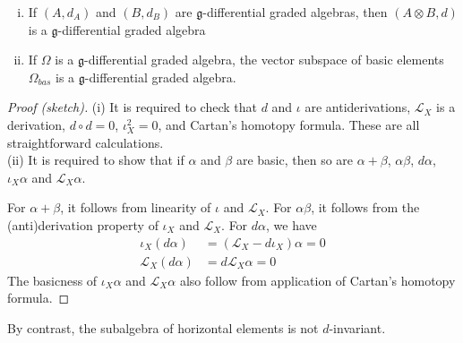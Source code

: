 \begin{prop}  \label{prop:dga_operations}
	\phantom{}	%
	\begin{enumerate}[(i), leftmargin=\parindent]
	    \item 
			If $(A,d_A)$ and  $(B,d_B)$ are $\mathfrak{g}$-differential graded 
			algebras, then $(A\otimes B,d)$ is a $\mathfrak{g}$-differential graded 
			algebra
		\item 
	If $\Omega$ is a  $\mathfrak{g}$-differential graded algebra, the vector
	subspace of basic elements $\Omega_{bas}$ is a $\mathfrak{g}$-differential
	graded algebra.
	\end{enumerate}
\end{prop}
\begin{proof}[Proof (sketch)]
	(i) It is required to check that $d$ and $\iota$ are antiderivations,
	$\mathcal{L}_X$ is a derivation, $d\circ d = 0$,  $\iota_X^2=0$, and
	Cartan's homotopy formula. These are all straightforward calculations.\\
	(ii) It is required to show that if $\alpha$ and  $\beta$ are basic, then so
	are $\alpha+\beta$,  $\alpha\beta$,  $d\alpha$,  $\iota_X \alpha$ and
	$\mathcal{L}_X\alpha $. 

	For $\alpha+\beta$, it follows from linearity of  $\iota$ and
	$\mathcal{L}_X$. For $\alpha\beta$, it follows from the (anti)derivation
	property of $\iota_X$ and  $\mathcal{L}_X$. For $d\alpha$, we have 
	 \begin{align*}
		 \iota_X(d\alpha) &= (\mathcal{L}_X-d\iota_X)\alpha = 0 \tag{by Cartan's
		 homotopy formula} \\
			 \mathcal{L}_X(d\alpha) &= d\mathcal{L}_X \alpha = 0 
		\tag{again by Cartan's homotopy formula}
	 \end{align*} 
	The basicness of $\iota_X\alpha$ and  $\mathcal{L}_X\alpha$ also follow 
	from application of Cartan's homotopy formula.
\end{proof}
By contrast, the subalgebra of horizontal elements is not
$d$-invariant.

